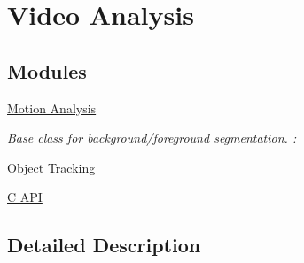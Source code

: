 \hypertarget{group__video}{}\section{Video Analysis}
\label{group__video}
\subsection*{Modules}
\begin{DoxyCompactItemize}
\item 
\hyperlink{group__video__motion}{Motion Analysis}
\begin{DoxyCompactList}\small\item\em Base class for background/foreground segmentation. \+: \end{DoxyCompactList}\item 
\hyperlink{group__video__track}{Object Tracking}
\item 
\hyperlink{group__video__c}{C A\+PI}
\end{DoxyCompactItemize}


\subsection{Detailed Description}
